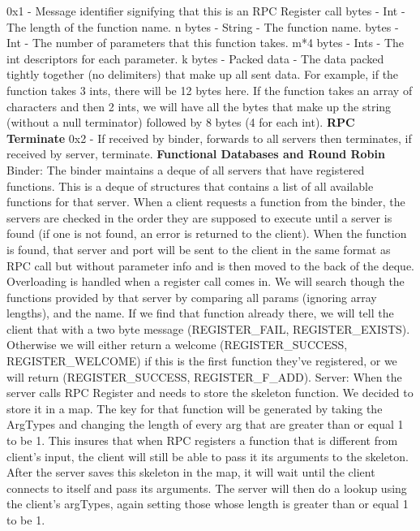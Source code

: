 \documentclass[]{article}
\begin{document}
0x1 - Message identifier signifying that this is an RPC Register call bytes - Int - The length of the function name.\newline
n bytes - String - The function name. bytes - Int - The number of parameters that this function takes.\newline
m*4 bytes - Ints - The int descriptors for each parameter.\newline
k bytes - Packed data - The data packed tightly together (no delimiters) that make up all sent data. For example, if the function takes 3 ints, there will be 12 bytes here. If the function takes an array of characters and then 2 ints, we will have all the bytes that make up the string (without a null terminator) followed by 8 bytes (4 for each int).
\newline\newline
{\bf RPC Terminate}\newline
0x2 - If received by binder, forwards to all servers then terminates, if received by server, terminate.\newline\newline
{\bf Functional Databases and Round Robin}\newline
Binder:\newline
The binder maintains a deque of all servers that have registered functions. This is a deque of structures that contains a list of all available functions for that server. When a client requests a function from the binder, the servers are checked in the order they are supposed to execute until a server is found (if one is not found, an error is returned to the client). When the function is found, that server and port will be sent to the client in the same format as RPC call but without parameter info and is then moved to the back of the deque. Overloading is handled when a register call comes in. We will search though the functions provided by that server by comparing all params (ignoring array lengths), and the name. If we find that function already there, we will tell the client that with a two byte message (REGISTER\_FAIL, REGISTER\_EXISTS). Otherwise we will either return a welcome (REGISTER\_SUCCESS, REGISTER\_WELCOME) if this is the first function they've registered, or we will return (REGISTER\_SUCCESS, REGISTER\_F\_ADD).\newline\newline
Server:\newline
When the server calls RPC Register and needs to store the skeleton function. We decided to store it in a map. The key for that function will be generated by taking the ArgTypes and changing the length of every arg that are greater than or equal 1 to be 1. This insures that when RPC registers a function that is different from client's input, the client will still be able to pass it its arguments to the skeleton. After the server saves this skeleton in the map, it will wait until the client connects to itself and pass its arguments. The server will then do a lookup using the client's argTypes, again setting those whose length is greater than or equal 1 to be 1. 
\end{document}
